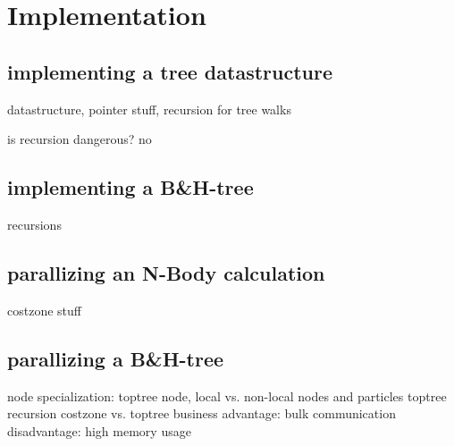 
\section{Implementation}

\subsection{implementing a tree datastructure}

datastructure, pointer stuff, recursion for tree walks

is recursion dangerous? no

\subsection{implementing a B\&H-tree}

recursions

\subsection{parallizing an N-Body calculation}

costzone stuff

\subsection{parallizing a B\&H-tree}

node specialization: toptree node, local vs. non-local nodes and particles
toptree recursion
costzone vs. toptree business
advantage: bulk communication
disadvantage: high memory usage